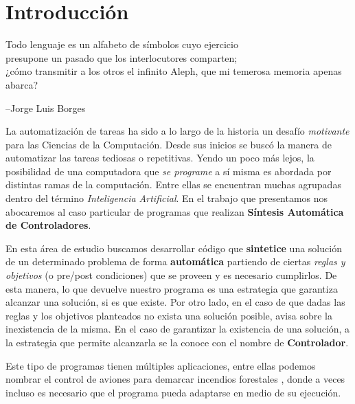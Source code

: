 \chapter{Introducción}
\label{cap:introduccion}

{\begin{small}%
\begin{flushright}%
\it

Todo lenguaje es un alfabeto de símbolos cuyo ejercicio \\  presupone un pasado que los interlocutores comparten; \\ ¿cómo transmitir a los otros el infinito Aleph, que mi temerosa memoria apenas abarca?

--Jorge Luis Borges
\end{flushright}%
\end{small}%
\vspace{.5cm}}

La automatización de tareas ha sido a lo largo de la historia un desafío \textit{motivante} para las Ciencias de la Computación. Desde sus inicios se buscó la manera de automatizar las tareas tediosas o repetitivas. Yendo un poco más lejos, la posibilidad de una computadora que \textit{se programe} a sí misma es abordada por distintas ramas de la computación. Entre ellas se encuentran muchas agrupadas dentro del término \textit{Inteligencia Artificial}. En el trabajo que presentamos nos abocaremos al caso particular de programas que realizan \textbf{Síntesis Automática de Controladores}.

En esta área de estudio buscamos desarrollar código que \textbf{sintetice} una solución de un determinado problema de forma \textbf{automática} partiendo de ciertas \textit{reglas y objetivos} (o pre/post condiciones) que se proveen y es necesario cumplirlos. De esta manera, lo que devuelve nuestro programa es una estrategia que garantiza alcanzar una solución, si es que existe. Por otro lado, en el caso de que dadas las reglas y los objetivos planteados no exista una solución posible, avisa sobre la inexistencia de la misma. En el caso de garantizar la existencia de una solución, a la estrategia que permite alcanzarla se la conoce con el nombre de \textbf{Controlador}.

Este tipo de programas tienen múltiples aplicaciones, entre ellas podemos nombrar el control de aviones para demarcar incendios forestales \cite{ZudaireIncendio}, donde a veces incluso es necesario que el programa pueda adaptarse en medio de su ejecución.

